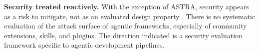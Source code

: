 \noindent\textbf{Security treated reactively.} With the exception of ASTRA, security appears as a risk to mitigate, not as an evaluated design property \cite{XiangzheXu2025}. There is no systematic evaluation of the attack surface of agentic frameworks, especially of community extensions, skills, and plugins. The direction indicated is a security evaluation framework specific to agentic development pipelines.

